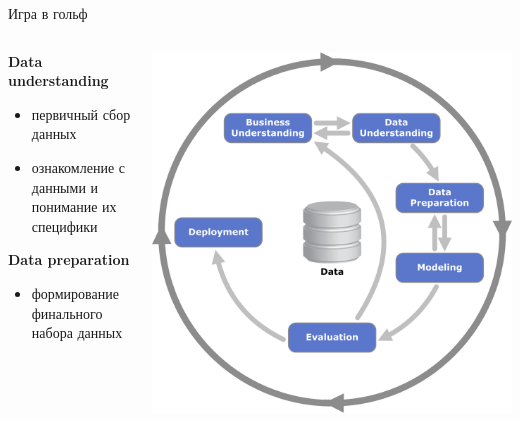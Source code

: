 \documentclass[aspectratio=169]{beamer}
\begin{document}
\begin{frame}{Игра в гольф}

\begin{columns}
    \begin{column}{.7\textwidth}
		{\bf Data understanding}
		\begin{itemize}
		\item первичный сбор данных
		\item ознакомление с данными и понимание их специфики
		\end{itemize}
		
		\vspace{1em}

		{\bf Data preparation}
		\begin{itemize}
		\item формирование финального набора данных
		\end{itemize}
    \end{column}
    \begin{column}{.3\textwidth}
    \vspace{-0em}
		\begin{center}
   		\includegraphics[width=\textwidth]{images/crisp.png}
    \end{center}
    \end{column}
  \end{columns}

\end{frame}
\end{document}
